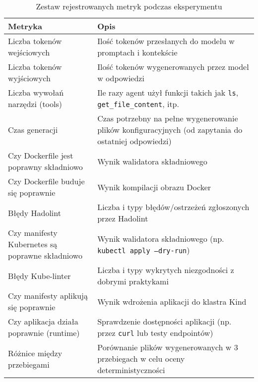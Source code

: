\begin{table}[H]
\centering
\caption{Zestaw rejestrowanych metryk podczas eksperymentu}
\label{tab:metrics}
\begin{tabularx}{\textwidth}{|X|X|}
\hline
\textbf{Metryka} & \textbf{Opis} \\
\hline
Liczba tokenów wejściowych & Ilość tokenów przesłanych do modelu w promptach i kontekście \\
\hline
Liczba tokenów wyjściowych & Ilość tokenów wygenerowanych przez model w odpowiedzi \\
\hline
Liczba wywołań narzędzi (tools) & Ile razy agent użył funkcji takich jak \texttt{ls}, \texttt{get\_file\_content}, itp. \\
\hline
Czas generacji & Czas potrzebny na pełne wygenerowanie plików konfiguracyjnych (od zapytania do ostatniej odpowiedzi) \\
\hline
Czy Dockerfile jest poprawny składniowo & Wynik walidatora składniowego \\
\hline
Czy Dockerfile buduje się poprawnie & Wynik kompilacji obrazu Docker \\
\hline
Błędy Hadolint & Liczba i typy błędów/ostrzeżeń zgłoszonych przez Hadolint \\
\hline
Czy manifesty Kubernetes są poprawne składniowo & Wynik walidatora składniowego (np. \texttt{kubectl apply --dry-run}) \\
\hline
Błędy Kube-linter & Liczba i typy wykrytych niezgodności z dobrymi praktykami \\
\hline
Czy manifesty aplikują się poprawnie & Wynik wdrożenia aplikacji do klastra Kind \\
\hline
Czy aplikacja działa poprawnie (runtime) & Sprawdzenie dostępności aplikacji (np. przez \texttt{curl} lub testy endpointów) \\
\hline
Różnice między przebiegami & Porównanie plików wygenerowanych w 3 przebiegach w celu oceny deterministyczności \\
\hline
\end{tabularx}
\end{table}